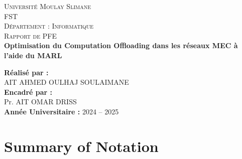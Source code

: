 \documentclass[12pt,a4paper]{report}
\begin{document}
\begin{titlepage}
    \centering
    
    \textsc{\LARGE Université Moulay Slimane}\\[0.5cm]
    \textsc{\Large FST}\\[0.5cm]
    \textsc{\large Département : Informatique}\\[2cm]
    
    
    \textsc{\Large Rapport de PFE}\\[1.5cm]
    
    {\Huge \bfseries Optimisation du Computation Offloading dans les réseaux MEC à l’aide du MARL\\[0.5cm]}
    
    \vfill
    
    \textbf{Réalisé par :}\\
    AIT AHMED OULHAJ SOULAIMANE \\[1cm]
    
    \textbf{Encadré par :}\\
    Pr. AIT OMAR DRISS\\[1cm]
    
    \textbf{Année Universitaire :} 2024 -- 2025
    
\end{titlepage}

\tableofcontents
\newpage

\listoffigures
\newpage

\section*{Summary of Notation}
\end{document}
